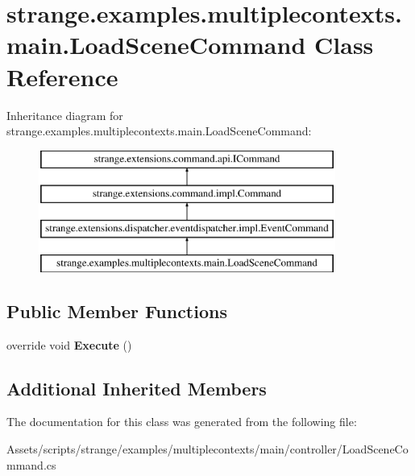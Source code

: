 \hypertarget{classstrange_1_1examples_1_1multiplecontexts_1_1main_1_1_load_scene_command}{\section{strange.\-examples.\-multiplecontexts.\-main.\-Load\-Scene\-Command Class Reference}
\label{classstrange_1_1examples_1_1multiplecontexts_1_1main_1_1_load_scene_command}
}
Inheritance diagram for strange.\-examples.\-multiplecontexts.\-main.\-Load\-Scene\-Command\-:\begin{figure}[H]
\begin{center}
\leavevmode
\includegraphics[height=4.000000cm]{classstrange_1_1examples_1_1multiplecontexts_1_1main_1_1_load_scene_command}
\end{center}
\end{figure}
\subsection*{Public Member Functions}
\begin{DoxyCompactItemize}
\item 
\hypertarget{classstrange_1_1examples_1_1multiplecontexts_1_1main_1_1_load_scene_command_a9f49cce46c097cae3a12ea9f4da4092e}{override void {\bfseries Execute} ()}\label{classstrange_1_1examples_1_1multiplecontexts_1_1main_1_1_load_scene_command_a9f49cce46c097cae3a12ea9f4da4092e}

\end{DoxyCompactItemize}
\subsection*{Additional Inherited Members}


The documentation for this class was generated from the following file\-:\begin{DoxyCompactItemize}
\item 
Assets/scripts/strange/examples/multiplecontexts/main/controller/Load\-Scene\-Command.\-cs\end{DoxyCompactItemize}

